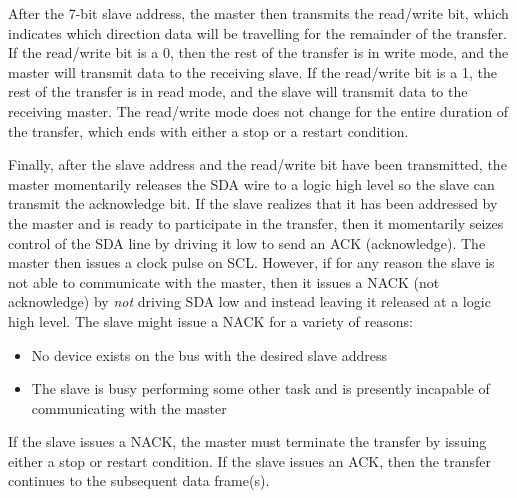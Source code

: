 After the 7-bit slave address, the master then transmits the read/write bit, which indicates which direction data will be travelling for the remainder of the transfer. If the read/write bit is a 0, then the rest of the transfer is in write mode, and the master will transmit data to the receiving slave. If the read/write bit is a 1, the rest of the transfer is in read mode, and the slave will transmit data to the receiving master. The read/write mode does not change for the entire duration of the transfer, which ends with either a stop or a restart condition.

Finally, after the slave address and the read/write bit have been transmitted, the master momentarily releases the SDA wire to a logic high level so the slave can transmit the acknowledge bit. If the slave realizes that it has been addressed by the master and is ready to participate in the transfer, then it momentarily seizes control of the SDA line by driving it low to send an ACK (acknowledge). The master then issues a clock pulse on SCL. However, if for any reason the slave is not able to communicate with the master, then it issues a NACK (not acknowledge) by \textit{not} driving SDA low and instead leaving it released at a logic high level. The slave might issue a NACK for a variety of reasons:
\begin{itemize}
	\item No device exists on the bus with the desired slave address
	\item The slave is busy performing some other task and is presently incapable of communicating with the master
\end{itemize}
If the slave issues a NACK, the master must terminate the transfer by issuing either a stop or restart condition. If the slave issues an ACK, then the transfer continues to the subsequent data frame(s).

